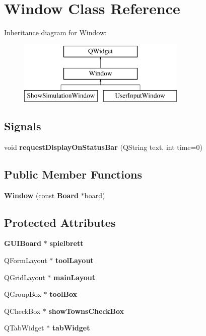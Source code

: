 \section{Window Class Reference}
\label{class_window}
Inheritance diagram for Window\-:\begin{figure}[H]
\begin{center}
\leavevmode
\includegraphics[height=3.000000cm]{class_window}
\end{center}
\end{figure}
\subsection*{Signals}
\begin{DoxyCompactItemize}
\item 
void {\bfseries request\-Display\-On\-Status\-Bar} (Q\-String text, int time=0)\label{class_window_ab6b062b8af87f2ec993bf633fc4f2d46}

\end{DoxyCompactItemize}
\subsection*{Public Member Functions}
\begin{DoxyCompactItemize}
\item 
{\bf Window} (const {\bf Board} $\ast$board)
\end{DoxyCompactItemize}
\subsection*{Protected Attributes}
\begin{DoxyCompactItemize}
\item 
{\bf G\-U\-I\-Board} $\ast$ {\bfseries spielbrett}\label{class_window_afc83752db1657acb7c47a135b5cc481c}

\item 
Q\-Form\-Layout $\ast$ {\bfseries tool\-Layout}\label{class_window_a7864a9891249e0e918d6ee5741a95a96}

\item 
Q\-Grid\-Layout $\ast$ {\bfseries main\-Layout}\label{class_window_ab4750bf3acf837e41ee9e4e6a9fa9856}

\item 
Q\-Group\-Box $\ast$ {\bfseries tool\-Box}\label{class_window_ae8f34f3af8ae8ed460a6260057c40acb}

\item 
Q\-Check\-Box $\ast$ {\bfseries show\-Towns\-Check\-Box}\label{class_window_a8412b9181c563862e596c3dd6c7d9cbf}

\item 
Q\-Tab\-Widget $\ast$ {\bfseries tab\-Widget}\label{class_window_ab5631a2fe8d9f7c62e344270543cff20}

\end{DoxyCompactItemize}


